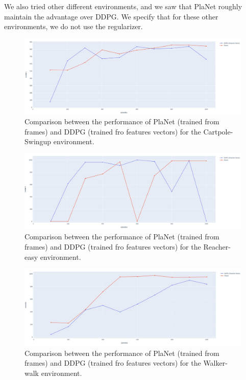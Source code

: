 We also tried other different environments, and we saw that PlaNet roughly maintain the advantage over DDPG. 
We specify that for these other environments, we do not use the regularizer.

\begin{figure}[H]
\centering
\includegraphics[width=1 \textwidth, height=.25\textheight]{pictures/cartpole_planet_vs_ddpg}
\caption{ Comparison between the performance of PlaNet (trained from frames) and DDPG (trained fro features vectors) for the Cartpole-Swingup environment.  }
\end{figure}
\begin{figure}[H]
\centering
\includegraphics[width=1 \textwidth, height=.25\textheight]{pictures/reacher_planet_vs_ddpg}
\caption{ Comparison between the performance of PlaNet (trained from frames) and DDPG (trained fro features vectors) for the Reacher-easy environment.  }
\end{figure}
\begin{figure}[H]
\centering
\includegraphics[width=1 \textwidth, height=.25\textheight]{pictures/walker_planet_vs_ddpg}
\caption{ Comparison between the performance of PlaNet (trained from frames) and DDPG (trained fro features vectors) for the Walker-walk environment.  }
\end{figure}

